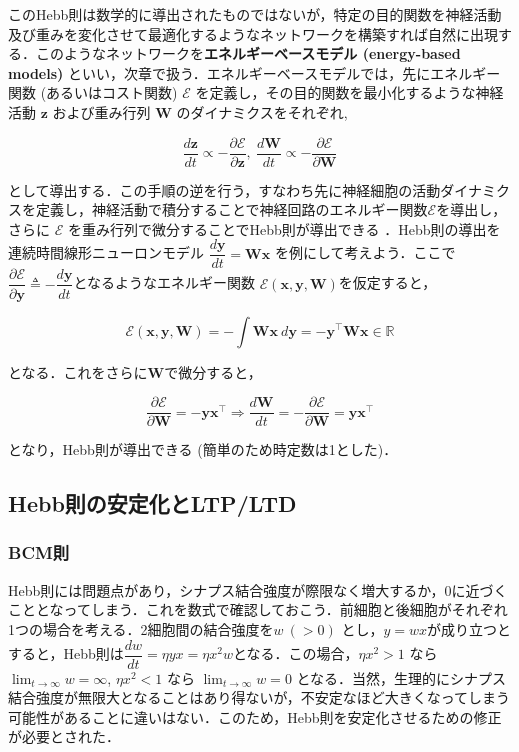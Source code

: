 このHebb則は数学的に導出されたものではないが，特定の目的関数を神経活動及び重みを変化させて最適化するようなネットワークを構築すれば自然に出現する．このようなネットワークを\textbf{エネルギーベースモデル (energy-based models)} といい，次章で扱う．エネルギーベースモデルでは，先にエネルギー関数 (あるいはコスト関数) $\mathcal{E}$ を定義し，その目的関数を最小化するような神経活動 $\mathbf{z}$ および重み行列 $\mathbf{W}$ のダイナミクスをそれぞれ,


\begin{equation}
\frac{d \mathbf{z}}{dt}\propto-\frac{\partial \mathcal{E}}{\partial \mathbf{z}},\ \frac{d \mathbf{W}}{dt}\propto-\frac{\partial \mathcal{E}}{\partial \mathbf{W}}
\end{equation}


として導出する．この手順の逆を行う，すなわち先に神経細胞の活動ダイナミクスを定義し，神経活動で積分することで神経回路のエネルギー関数$\mathcal{E}$を導出し，さらに $\mathcal{E}$ を重み行列で微分することでHebb則が導出できる \citep{Isomura2020-sn}．Hebb則の導出を連続時間線形ニューロンモデル $\dfrac{d\mathbf{y}}{dt}=\mathbf{W}\mathbf{x}$ を例にして考えよう．ここで$\dfrac{\partial\mathcal{E}}{\partial\mathbf{y}}\triangleq-\dfrac{d\mathbf{y}}{dt}$となるようなエネルギー関数 $\mathcal{E}(\mathbf{x}, \mathbf{y}, \mathbf{W})$を仮定すると，


\begin{equation}
\mathcal{E}(\mathbf{x}, \mathbf{y}, \mathbf{W})=-\int \mathbf{W}\mathbf{x}\ d\mathbf{y}=-\mathbf{y}^\top \mathbf{W}\mathbf{x} \in \mathbb{R}
\end{equation}


となる．これをさらに$\mathbf{W}$で微分すると，


\begin{equation}
\dfrac{\partial\mathcal{E}}{\partial\mathbf{W}}=-\mathbf{y}\mathbf{x}^\top\Rightarrow
\frac{d\mathbf{W}}{dt}=-\dfrac{\partial\mathcal{E}}{\partial\mathbf{W}}=\mathbf{y}\mathbf{x}^\top
\end{equation}


となり，Hebb則が導出できる (簡単のため時定数は1とした)．
\subsection{Hebb則の安定化とLTP/LTD}
\subsubsection{BCM則}
Hebb則には問題点があり，シナプス結合強度が際限なく増大するか，0に近づくこととなってしまう．これを数式で確認しておこう．前細胞と後細胞がそれぞれ1つの場合を考える．2細胞間の結合強度を$w\ (>0)$ とし，$y=wx$が成り立つとすると，Hebb則は$\dfrac{dw}{dt}=\eta yx=\eta x^2w$となる．この場合，$\eta x^2>1$ なら $\lim_{t\to\infty} w= \infty$, $\eta x^2<1$ なら $\lim_{t\to\infty} w= 0$ となる．当然，生理的にシナプス結合強度が無限大となることはあり得ないが，不安定なほど大きくなってしまう可能性があることに違いはない．このため，Hebb則を安定化させるための修正が必要とされた．

